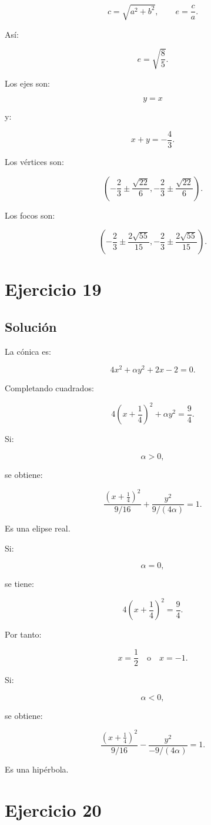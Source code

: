 \documentclass[11pt,a4paper]{article}
\begin{document}
\[
c=\sqrt{a^2+b^2},
\qquad
e=\frac ca.
\]

Así:

\[
\boxed{
e=\sqrt{\frac85}.
}
\]

Los ejes son:

\[
\boxed{
y=x
}
\]

y:

\[
\boxed{
x+y=-\frac43.
}
\]

Los vértices son:

\[
\boxed{
\left(
-\frac23\pm\frac{\sqrt{22}}6,
-\frac23\pm\frac{\sqrt{22}}6
\right).
}
\]

Los focos son:

\[
\boxed{
\left(
-\frac23\pm\frac{2\sqrt{55}}{15},
-\frac23\pm\frac{2\sqrt{55}}{15}
\right).
}
\]

\section{Ejercicio 19}
\subsection{Solución}

La cónica es:

\[
4x^2+\alpha y^2+2x-2=0.
\]

Completando cuadrados:

\[
4\left(
x+\frac14
\right)^2
+
\alpha y^2
=
\frac94.
\]

Si:

\[
\alpha>0,
\]

se obtiene:

\[
\boxed{
\frac{(x+\frac14)^2}{9/16}
+
\frac{y^2}{9/(4\alpha)}
=
1.
}
\]

Es una elipse real.

Si:

\[
\alpha=0,
\]

se tiene:

\[
4\left(
x+\frac14
\right)^2
=
\frac94.
\]

Por tanto:

\[
\boxed{
x=\frac12
\quad\text{o}\quad
x=-1.
}
\]

Si:

\[
\alpha<0,
\]

se obtiene:

\[
\boxed{
\frac{(x+\frac14)^2}{9/16}
-
\frac{y^2}{-9/(4\alpha)}
=
1.
}
\]

Es una hipérbola.

\section{Ejercicio 20}
\end{document}
